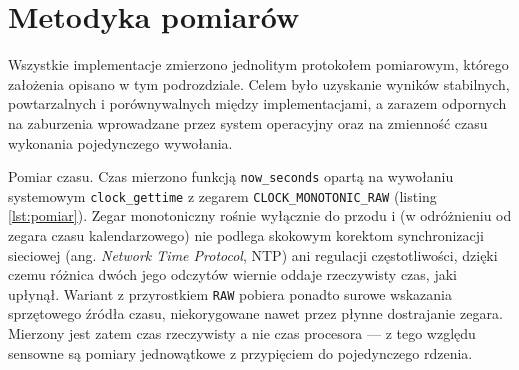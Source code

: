 \documentclass[a4paper,12pt]{book} %
\begin{document}
\section{Metodyka pomiarów}
\label{sec:metodyka}

Wszystkie implementacje zmierzono jednolitym protokołem pomiarowym, którego założenia opisano w tym podrozdziale. Celem było uzyskanie wyników stabilnych, powtarzalnych i porównywalnych między implementacjami, a zarazem odpornych na zaburzenia wprowadzane przez system operacyjny oraz na zmienność czasu wykonania pojedynczego wywołania.

Pomiar czasu. Czas mierzono funkcją \texttt{now\_seconds} opartą na wywołaniu systemowym \texttt{clock\_gettime} z zegarem \texttt{CLOCK\_MONOTONIC\_RAW} (listing \ref{lst:pomiar}). Zegar monotoniczny rośnie wyłącznie do przodu i (w odróżnieniu od zegara czasu kalendarzowego) nie podlega skokowym korektom synchronizacji sieciowej (ang. \emph{Network Time Protocol}, NTP) ani regulacji częstotliwości, dzięki czemu różnica dwóch jego odczytów wiernie oddaje rzeczywisty czas, jaki upłynął. Wariant z przyrostkiem \texttt{RAW} pobiera ponadto surowe wskazania sprzętowego źródła czasu, niekorygowane nawet przez płynne dostrajanie zegara. Mierzony jest zatem czas rzeczywisty a nie czas procesora --- z tego względu sensowne są pomiary jednowątkowe z przypięciem do pojedynczego rdzenia.
\end{document}
